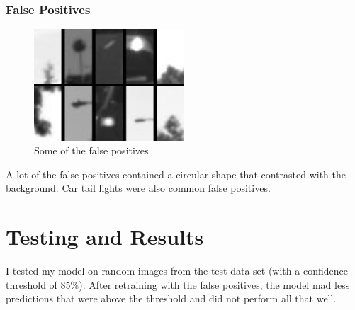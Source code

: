 \documentclass[a4paper]{article}
\begin{document}
\subsubsection{False Positives}
\begin{figure}[!htb]
\centering
\includegraphics[width=0.5\textwidth]{falsePositives.jpg}
    \caption{\label{fig:masks} Some of the false positives}
\end{figure}
A lot of the false positives contained a circular shape that contrasted with the background.  Car tail lights were also common false positives.

\section{Testing and Results}
I tested my model on random images from the test data set (with a confidence threshold of 85\%).  After retraining with the false positives, the model mad less predictions that were above the threshold and did not perform all that well.
\end{document}
